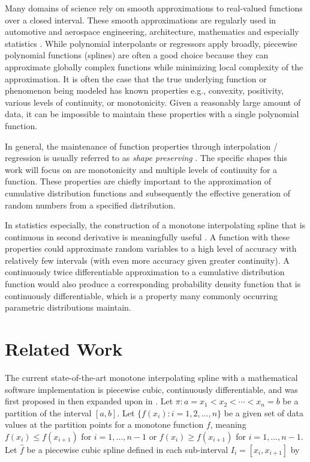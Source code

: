 
Many domains of science rely on smooth approximations to real-valued functions over a closed interval. These smooth approximations are regularly used in automotive and aerospace engineering, architecture, mathematics and especially statistics \cite{knott2012interpolating}. While polynomial interpolants or regressors apply broadly, piecewise polynomial functions (splines) are often a good choice because they can approximate globally complex functions while minimizing local complexity of the approximation. It is often the case that the true underlying function or phenomenon being modeled has known properties e.g., convexity, positivity, various levels of continuity, or monotonicity. Given a reasonably large amount of data, it can be impossible to maintain these properties with a single polynomial function.

In general, the maintenance of function properties through interpolation / regression is usually referred to as \textit{shape preserving} \cite{fritsch1980monotone,gregory1985shape}. The specific shapes this work will focus on are monotonicity and multiple levels of continuity for a function. These properties are chiefly important to the approximation of cumulative distribution functions and subsequently the effective generation of random numbers from a specified distribution. 

In statistics especially, the construction of a monotone interpolating spline that is continuous in second derivative is meaningfully useful \cite{ramsay1988monotone}. A function with these properties could approximate random variables to a high level of accuracy with relatively few intervals (with even more accuracy given greater continuity). A continuously twice differentiable approximation to a cumulative distribution function would also produce a corresponding probability density function that is continuously differentiable, which is a property many commonly occurring parametric distributions maintain.


\section{Related Work}

The current state-of-the-art monotone interpolating spline with a mathematical software implementation is piecewise cubic, continuously differentiable, and was first proposed in \citet{fritsch1980monotone} then expanded upon in \citet{carlson1985monotone}. Let $\pi: a = x_1 < x_2 < \cdots < x_n = b$ be a partition of the interval $[a,b]$. Let $\{f(x_i) : i = 1,2,\ldots,n\}$ be a given set of data values at the partition points for a monotone function $f$, meaning $f(x_i) \leq f(x_{i+1})$ for $i = 1, \ldots, n-1$ or $f(x_i) \geq f(x_{i+1})$ for $i = 1, \ldots, n-1$. Let $\hat f$ be a piecewise cubic spline defined in each sub-interval $I_i = [x_i, x_{i+1}]$ by

